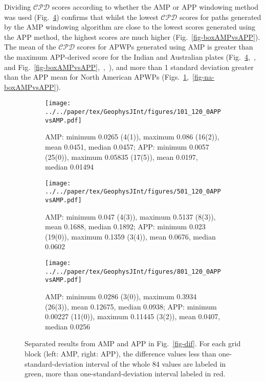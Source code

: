 Dividing $\mathcal{CPD}$ scores according to whether the AMP or APP windowing
method was used (Fig.~\ref{fig-difAMPvsAPP}) confirms that whilst the lowest
$\mathcal{CPD}$ scores for paths generated by the AMP windowing algorithm are
close to the lowest scores generated using the APP method, the highest scores
are much higher (Fig.~\ref{fig-boxAMPvsAPP}). The mean of the $\mathcal{CPD}$
scores for APWPs generated using AMP is greater than the maximum APP-derived
score for the Indian and Australian plates
(Fig.~\ref{fig-difAMPvsAPP},~,~
and Fig.~\ref{fig-boxAMPvsAPP},~,~),
and more than 1 standard deviation greater than the APP mean for North American
APWPs (Figs.~\ref{fig-na-difAMPvsAPP},~\ref{fig-na-boxAMPvsAPP}).

\begin{figure}
  \centering
  \begin{subfigure}{1.01\textwidth}
    \texttt{[image: ../../paper/tex/GeophysJInt/figures/101\_120\_0APPvsAMP.pdf]}
    \caption{AMP\@: minimum 0.0265 (4(1)), maximum 0.086 (16(2)), mean 0.0451,
      median 0.0457; APP\@: minimum 0.0057 (25(0)), maximum 0.05835 (17(5)),
      mean 0.0197, median 0.01494}\label{fig-na-difAMPvsAPP}
  \end{subfigure}
  \vspace{.1em}
  \begin{subfigure}{1.01\textwidth}
    \texttt{[image: ../../paper/tex/GeophysJInt/figures/501\_120\_0APPvsAMP.pdf]}
    \caption{AMP\@: minimum 0.047 (4(3)), maximum 0.5137 (8(3)), mean 0.1688,
      median 0.1892; APP\@: minimum 0.023 (19(0)), maximum 0.1359 (3(4)), mean
      0.0676, median 0.0602}\label{fig-in-difAMPvsAPP}
  \end{subfigure}
  \vspace{.1em}
  \begin{subfigure}{1.01\textwidth}
    \texttt{[image: ../../paper/tex/GeophysJInt/figures/801\_120\_0APPvsAMP.pdf]}
    \caption{AMP\@: minimum 0.0286 (3(0)), maximum 0.3934 (26(3)), mean 0.12675,
      median 0.0938; APP\@: minimum 0.00227 (11(0)), maximum 0.11445 (3(2)),
      mean 0.0407, median 0.0256}\label{fig-au-difAMPvsAPP}
  \end{subfigure}
  \caption[$\mathcal{CPD}$ of each plate's paleomagnetic APWPs vs its FHM
    predicted APWP (AMP vs APP)]{Separated results from AMP and APP in
    Fig.~\ref{fig-dif}. For each grid block (left: AMP, right: APP), the
    difference values less than one-standard-deviation interval of the whole 84
    values are labeled in green, more than one-standard-deviation interval
    labeled in red.}\label{fig-difAMPvsAPP}
\end{figure}

